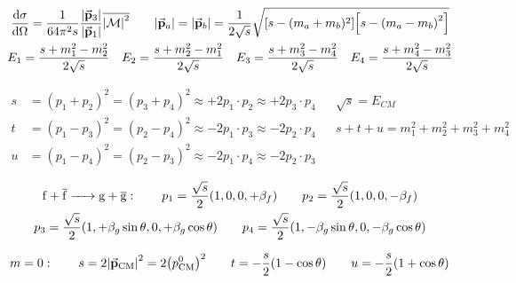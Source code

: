 \begin{gather*}
        \dv{\sigma}{\Omega} = \frac{1}{64\pi^2s}\frac{\abs{\va{p}_{3}}}{\abs{\va{p}_{1}}}\overline{\abs{\operatorname{\mathcal{M}}}^2}
        \qquad
        \abs{\va{p}_a} = \abs{\va{p}_b} = \frac{1}{2\sqrt{s}}\sqrt{\qty[s - (m_a+m_b)^2]\qty[s - \qty(m_a-m_b)^2]}
        \\
        E_1 = \frac{s + m_1^2 - m_2^2}{2\sqrt{s}}
        \quad
        E_2 = \frac{s + m_2^2 - m_1^2}{2\sqrt{s}}
        \quad
        E_3 = \frac{s + m_3^2 - m_4^2}{2\sqrt{s}}
        \quad
        E_4 = \frac{s + m_4^2 - m_3^2}{2\sqrt{s}}
\end{gather*}

\begin{align*}
        s
        &= (p_1 + p_2)^2 = (p_3 + p_4)^2
        \approx +2p_1\cdot p_2 \approx +2p_3\cdot p_4
        &&
        \sqrt{s} = E_{CM}
        \\
        t
        &= (p_1 - p_3)^2 = (p_2 - p_4)^2
        \approx -2p_1\cdot p_3 \approx -2p_2\cdot p_4
        &&
        s + t + u = m_1^2 + m_2^2 + m_3^2 + m_4^2
        \\
        u
        &= (p_1 - p_4)^2 = (p_2 - p_3)^2
        \approx -2p_1\cdot p_4 \approx -2p_2\cdot p_3
\end{align*}

\begin{gather*}
        \ce{f + $\overline{\mathrm{f}}$ -> g + $\overline{\mathrm{g}}$}:
        \qquad
        p_1 = \frac{\sqrt{s}}{2}\qty(1, 0, 0, +\beta_f)
        \qquad
        p_2 = \frac{\sqrt{s}}{2}\qty(1, 0, 0, -\beta_f)
        \\
        p_3 = \frac{\sqrt{s}}{2}\qty(1, +\beta_g\sin\theta, 0, +\beta_g\cos\theta)
        \qquad
        p_4 = \frac{\sqrt{s}}{2}\qty(1, -\beta_g\sin\theta, 0, -\beta_g\cos\theta)
\end{gather*}

\begin{equation*}
        m=0
        :\qquad
        s
        = 2\abs{\va{p}_{\mathrm{CM}}}^2
        = 2\qty(p^0_{\mathrm{CM}})^2
        \qquad
        t = -\frac{s}{2}\qty(1 - \cos\theta)
        \qquad
        u = -\frac{s}{2}\qty(1 + \cos\theta)
\end{equation*}
